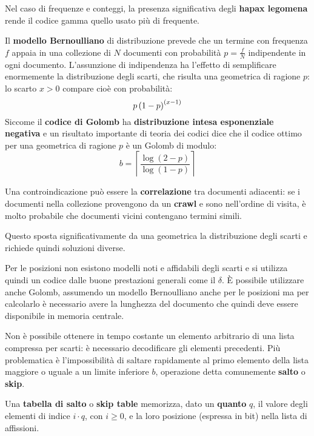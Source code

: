 \documentclass[\main/main.tex]{subfiles}
\begin{document}
\begin{multicols}{2}
\begin{observation}
    Nel caso di frequenze e conteggi, la presenza significativa degli \textbf{hapax legomena} rende il codice gamma quello usato più di frequente.
\end{observation}
\begin{observation}
    Il \textbf{modello Bernoulliano} di distribuzione prevede che un termine con frequenza \(f\) appaia in una collezione di \(N\) documenti con probabilità \(p = \frac{f}{N}\) indipendente in ogni documento. L'assunzione di indipendenza ha l'effetto di semplificare enormemente la distribuzione degli scarti, che risulta una geometrica di ragione \(p\): lo scarto \(x > 0\) compare cioè con probabilità:
    \[
        p\left(1-p\right)^{\left(x-1\right)}
    \]
    Siccome il \textbf{codice di Golomb} ha \textbf{distribuzione intesa esponenziale negativa} e un risultato importante di teoria dei codici dice che il codice ottimo per una geometrica di ragione \(p\) è un Golomb di modulo:
    \[
        b=\left\lceil\frac{\log (2-p)}{\log (1-p)}\right\rceil
    \]
\end{observation}
\begin{observation}
    Una controindicazione può essere la \textbf{correlazione} tra documenti adiacenti: se i documenti nella collezione provengono da un \textbf{crawl} e sono nell'ordine di visita, è molto probabile che documenti vicini contengano termini simili.
    
    Questo sposta significativamente da una geometrica la distribuzione degli scarti e richiede quindi soluzioni diverse.
\end{observation}
\begin{observation}
    Per le posizioni non esistono modelli noti e affidabili degli scarti e si utilizza quindi un codice dalle buone prestazioni generali come il \(\delta\). È possibile utilizzare anche Golomb, assumendo un modello Bernoulliano anche per le posizioni ma per calcolarlo è necessario avere la lunghezza del documento che quindi deve essere disponibile in memoria centrale.
\end{observation}
\begin{observation}
    Non è possibile ottenere in tempo costante un elemento arbitrario di una lista compressa per scarti: è necessario decodificare gli elementi precedenti. Più problematica è l'impossibilità di saltare rapidamente al primo elemento della lista maggiore o uguale a un limite inferiore \(b\), operazione detta comunemente \textbf{salto} o \textbf{skip}.
\end{observation}
\begin{definition}
    Una \textbf{tabella di salto} o \textbf{skip table} memorizza, dato un \textbf{quanto} \(q\), il valore degli elementi di indice \(i\cdot q\), con \(i\geq 0\), e la loro posizione (espressa in bit) nella lista di affissioni.
    

\end{definition}
\end{multicols}
\end{document}
